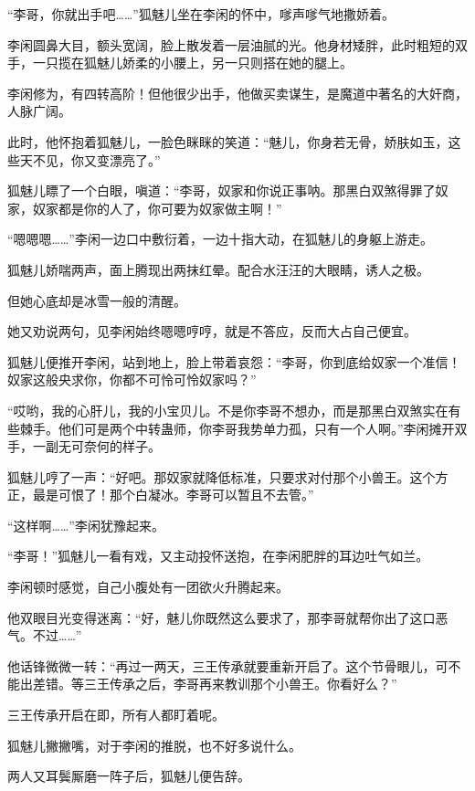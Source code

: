 
\begin{this_body}

“李哥，你就出手吧……”狐魅儿坐在李闲的怀中，嗲声嗲气地撒娇着。

李闲圆鼻大目，额头宽阔，脸上散发着一层油腻的光。他身材矮胖，此时粗短的双手，一只揽在狐魅儿娇柔的小腰上，另一只则搭在她的腿上。

李闲修为，有四转高阶！但他很少出手，他做买卖谋生，是魔道中著名的大奸商，人脉广阔。

此时，他怀抱着狐魅儿，一脸色眯眯的笑道：“魅儿，你身若无骨，娇肤如玉，这些天不见，你又变漂亮了。”

狐魅儿瞟了一个白眼，嗔道：“李哥，奴家和你说正事呐。那黑白双煞得罪了奴家，奴家都是你的人了，你可要为奴家做主啊！”

“嗯嗯嗯……”李闲一边口中敷衍着，一边十指大动，在狐魅儿的身躯上游走。

狐魅儿娇喘两声，面上腾现出两抹红晕。配合水汪汪的大眼睛，诱人之极。

但她心底却是冰雪一般的清醒。

她又劝说两句，见李闲始终嗯嗯哼哼，就是不答应，反而大占自己便宜。

狐魅儿便推开李闲，站到地上，脸上带着哀怨：“李哥，你到底给奴家一个准信！奴家这般央求你，你都不可怜可怜奴家吗？”

“哎哟，我的心肝儿，我的小宝贝儿。不是你李哥不想办，而是那黑白双煞实在有些棘手。他们可是两个中转蛊师，你李哥我势单力孤，只有一个人啊。”李闲摊开双手，一副无可奈何的样子。

狐魅儿哼了一声：“好吧。那奴家就降低标准，只要求对付那个小兽王。这个方正，最是可恨了！那个白凝冰。李哥可以暂且不去管。”

“这样啊……”李闲犹豫起来。

“李哥！”狐魅儿一看有戏，又主动投怀送抱，在李闲肥胖的耳边吐气如兰。

李闲顿时感觉，自己小腹处有一团欲火升腾起来。

他双眼目光变得迷离：“好，魅儿你既然这么要求了，那李哥就帮你出了这口恶气。不过……”

他话锋微微一转：“再过一两天，三王传承就要重新开启了。这个节骨眼儿，可不能出差错。等三王传承之后，李哥再来教训那个小兽王。你看好么？”

三王传承开启在即，所有人都盯着呢。

狐魅儿撇撇嘴，对于李闲的推脱，也不好多说什么。

两人又耳鬓厮磨一阵子后，狐魅儿便告辞。


\end{this_body}
